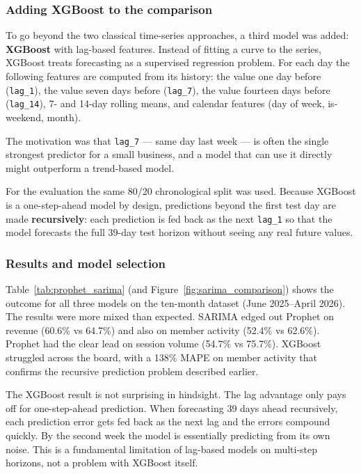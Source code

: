 \documentclass[12pt, a4paper]{report}
\begin{document}
\subsubsection*{Adding XGBoost to the comparison}

To go beyond the two classical time-series approaches, a third model was added:
\textbf{XGBoost} with lag-based features. Instead of fitting a curve to the
series, XGBoost treats forecasting as a supervised regression problem. For each
day the following features are computed from its history: the value one day
before (\texttt{lag\_1}), the value seven days before (\texttt{lag\_7}), the
value fourteen days before (\texttt{lag\_14}), 7- and 14-day rolling means, and
calendar features (day of week, is-weekend, month).

The motivation was that \texttt{lag\_7} --- same day last week --- is often the
single strongest predictor for a small business, and a model that can use it
directly might outperform a trend-based model.

For the evaluation the same 80/20 chronological split was used. Because XGBoost
is a one-step-ahead model by design, predictions beyond the first test day are
made \textbf{recursively}: each prediction is fed back as the next
\texttt{lag\_1} so that the model forecasts the full 39-day test horizon without
seeing any real future values.

\subsubsection*{Results and model selection}

Table~\ref{tab:prophet_sarima} (and Figure~\ref{fig:sarima_comparison}) shows
the outcome for all three models on the ten-month dataset (June 2025--April 2026).
The results were more mixed than expected. SARIMA edged out Prophet on revenue
(60.6\% vs 64.7\%) and also on member activity (52.4\% vs 62.6\%). Prophet
had the clear lead on session volume (54.7\% vs 75.7\%). XGBoost struggled
across the board, with a 138\% MAPE on member activity that confirms the
recursive prediction problem described earlier.

The XGBoost result is not surprising in hindsight. The lag advantage only pays
off for one-step-ahead prediction. When forecasting 39 days ahead recursively,
each prediction error gets fed back as the next lag and the errors compound
quickly. By the second week the model is essentially predicting from its own
noise. This is a fundamental limitation of lag-based models on multi-step
horizons, not a problem with XGBoost itself.
\end{document}
